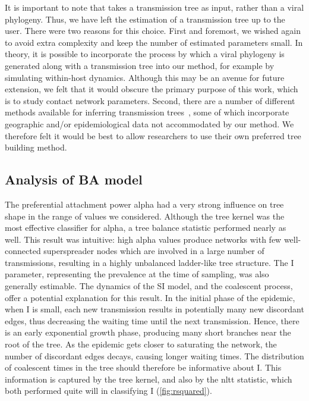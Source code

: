 It is important to note that  takes a transmission tree as
input, rather than a viral phylogeny. Thus, we have left the estimation of a
transmission tree up to the user. There were two reasons for this choice. First
and foremost, we wished again to avoid extra complexity and keep the number of
estimated parameters small. In theory, it is possible to incorporate the
process by which a viral phylogeny is generated along with a transmission tree
into our method, for example by simulating within-host dynamics. Although this
may be an avenue for future extension, we felt that it would obscure the
primary purpose of this work, which is to study contact network parameters.
Second, there are a number of different methods available for inferring
transmission trees~\autocite{didelot2014bayesian, ypma2012unravelling,
jombart2011reconstructing, cottam2008integrating, poon2015phylodynamic}, some
of which incorporate geographic and/or epidemiological data not accommodated by
our method. We therefore felt it would be best to allow researchers to use
their own preferred tree building method.


\subsection{Analysis of \acrlong{BA} model}

The preferential attachment power \gls{alpha} had a very strong influence on
tree shape in the range of values we considered. Although the tree kernel was
the most effective classifier for \gls{alpha}, a tree balance statistic
performed nearly as well. This result was intuitive: high \gls{alpha} values
produce networks with few well-connected superspreader nodes which are involved
in a large number of transmissions, resulting in a highly unbalanced
ladder-like tree structure. The \gls{I} parameter, representing the prevalence
at the time of sampling, was also generally estimable. The dynamics of the
\gls{SI} model, and the coalescent process, offer a potential explanation for
this result. In the initial phase of the epidemic, when \gls{I} is small, each
new transmission results in potentially many new discordant edges, thus
decreasing the waiting time until the next transmission. Hence, there is an
early exponential growth phase, producing many short branches near the root of
the tree. As the epidemic gets closer to saturating the network, the number of
discordant edges decays, causing longer waiting times. The distribution of
coalescent times in the tree should therefore be informative about \gls{I}.
This information is captured by the tree kernel, and also by the \gls{nltt}
statistic, which both performed quite will in classifying \gls{I}
(\cref{fig:rsquared}).

